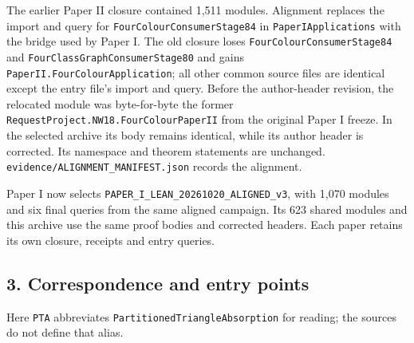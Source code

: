 \documentclass[english,11pt,a4paper]{article}
\begin{document}
The earlier Paper II closure contained 1,511 modules. Alignment replaces the import and query for \texttt{Four\allowbreak{}Colour\allowbreak{}Co\allowbreak{}nsumer\allowbreak{}Stage8\allowbreak{}4} in \texttt{Paper\allowbreak{}IApplic\allowbreak{}ations} with the bridge used by Paper I. The old closure loses \texttt{Four\allowbreak{}Colour\allowbreak{}Co\allowbreak{}nsumer\allowbreak{}Stage8\allowbreak{}4} and \texttt{Four\allowbreak{}Class\allowbreak{}Gra\allowbreak{}ph\allowbreak{}Consumer\allowbreak{}St\allowbreak{}age80} and gains \texttt{Paper\allowbreak{}II.\allowbreak{}Four\allowbreak{}\allowbreak{}Colour\allowbreak{}Applic\allowbreak{}ation}; all other common source files are identical except the entry file's import and query. Before the author-header revision, the relocated module was byte-for-byte the former \texttt{Request\allowbreak{}Proje\allowbreak{}ct.\allowbreak{}NW18.\allowbreak{}Four\allowbreak{}\allowbreak{}Colour\allowbreak{}Paper\allowbreak{}I\allowbreak{}I} from the original Paper I freeze. In the selected archive its body remains identical, while its author header is corrected. Its namespace and theorem statements are unchanged. \texttt{evidence/\allowbreak{}ALI\allowbreak{}GNMENT\_\allowbreak{}MANIF\allowbreak{}EST.\allowbreak{}json} records the alignment.

Paper I now selects \texttt{PAPER\_\allowbreak{}I\_\allowbreak{}LEAN\allowbreak{}\_\allowbreak{}20261020\_\allowbreak{}AL\allowbreak{}IGNED\_\allowbreak{}v3}, with 1,070 modules and six final queries from the same aligned campaign. Its 623 shared modules and this archive use the same proof bodies and corrected headers. Each paper retains its own closure, receipts and entry queries.


\subsection{3. Correspondence and entry points}\label{correspondence-and-entry-points}

Here \texttt{PTA} abbreviates \texttt{Partitioned\allowbreak{}T\allowbreak{}riangle\allowbreak{}Absor\allowbreak{}ption} for reading; the sources do not define that alias.
\end{document}
